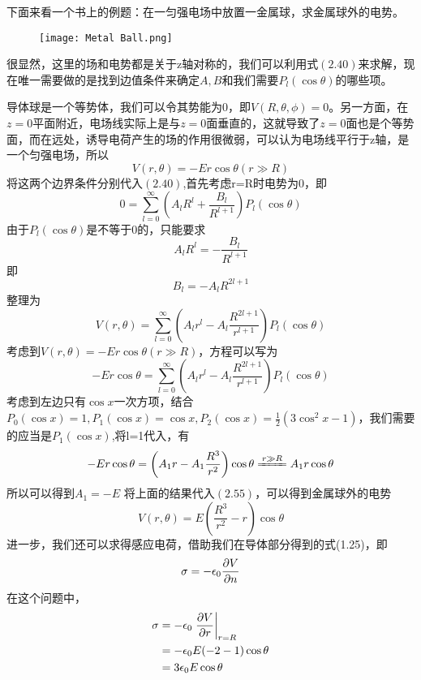 \documentclass[14pt,oneside]{book}
\begin{document}
\begin{large}
\begin{enumerate}
\end{enumerate}
下面来看一个书上的例题：在一匀强电场中放置一金属球，求金属球外的电势。
\begin{figure}[H]
\centering
  \texttt{[image: Metal Ball.png]}
\end{figure}
很显然，这里的场和电势都是关于z轴对称的，我们可以利用式$(2.40)$来求解，现在唯一需要做的是找到边值条件来确定$A,B$和我们需要$P_l(\cos{\theta})$的哪些项。

导体球是一个等势体，我们可以令其势能为0，即$V(R,\theta,\phi)=0$。另一方面，在$z=0$平面附近，电场线实际上是与$z=0$面垂直的，这就导致了$z=0$面也是个等势面，而在远处，诱导电荷产生的场的作用很微弱，可以认为电场线平行于z轴，是一个匀强电场，所以
\begin{equation}
  V(r,\theta)=-Er\cos\theta(r\gg R)
\end{equation}
将这两个边界条件分别代入$(2.40)$,首先考虑r=R时电势为0，即
\begin{equation}
0=\sum_{l=0}^{\infty}\left(A_l R^l+\frac{B_l}{R^{l+1}}\right) P_l(\cos \theta)
\end{equation}
由于$P_l(\cos{\theta})$是不等于0的，只能要求
\begin{equation}
 A_l R^l=-\frac{B_l}{R^{l+1}}
\end{equation}
即
\begin{equation}
  B_l=-A_l R^{2l+1}
\end{equation}
整理为
\begin{equation}
V(r, \theta)=\sum_{l=0}^{\infty} \left(A_l r^l-A_l \frac{R^{2 l+1}}{r^{l+1}} \right)P_l(\cos \theta)
\end{equation}
考虑到$ V(r,\theta)=-Er\cos\theta(r\gg R)$，方程可以写为
\begin{equation}
  -Er\cos\theta=\sum_{l=0}^{\infty} \left(A_l r^l-A_l \frac{R^{2 l+1}}{r^{l+1}} \right)P_l(\cos \theta)
\end{equation}
考虑到左边只有$\cos{x}$一次方项，结合$P_0(\cos x)=1,P_1(\cos x)=\cos x,P_2(\cos x)=\frac{1}{2}(3\cos^2 x-1)$，我们需要的应当是$P_1(\cos x)$,将l=1代入，有
\begin{equation}
  -Er\cos\theta=\left(A_1 r-A_1 \frac{R^{3}}{r^{2}}\right)\cos\theta\xlongequal[]{r\gg R}A_1r\cos\theta
\end{equation}
所以可以得到$A_1=-E$
将上面的结果代入$(2.55)$，可以得到金属球外的电势
\begin{equation}
  V(r,\theta)=E\left(\frac{R^{3}}{r^{2}}-r\right)\cos\theta
\end{equation}
进一步，我们还可以求得感应电荷，借助我们在导体部分得到的式(1.25)，即
\begin{equation}
  \sigma=-\epsilon_0\pdv{V}{n}
\end{equation}
在这个问题中，
\begin{equation}
\begin{aligned}
  \sigma&=-\epsilon_0\eval{\pdv{V}{r}}_{r=R}\\
  &=-\epsilon_0 E(-2-1)\cos \theta\\
  &=3\epsilon_0 E \cos\theta
  \end{aligned}
\end{equation}


\end{large}
\end{document}
